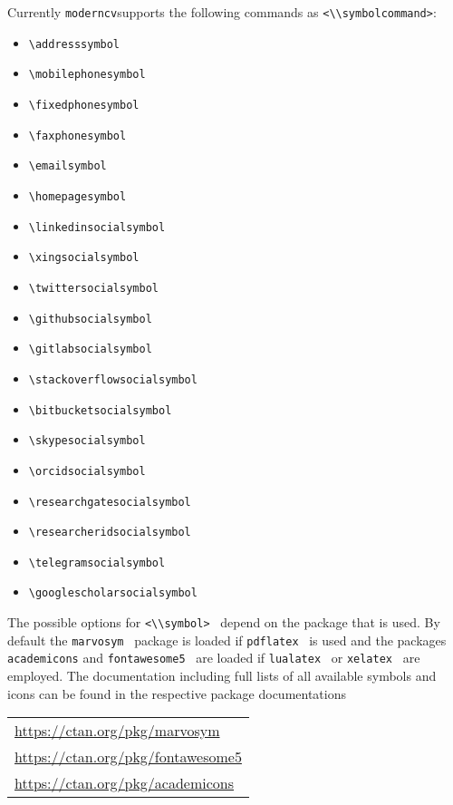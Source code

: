 \documentclass[a4paper,11pt]{article}
\newcommand{\code}[1]{\lstinline!#1!}
\newcommand{\Code}[1]{\lstinline!#1!~} %
\newcommand{\moderncv}{\code{moderncv}}
\begin{document}
Currently \moderncv supports the following commands as \code{<\\symbolcommand>}:
\begin{itemize}
  \item \lstinline!\addresssymbol!
  \item \lstinline!\mobilephonesymbol!
  \item \lstinline!\fixedphonesymbol!
  \item \lstinline!\faxphonesymbol!
  \item \lstinline!\emailsymbol!
  \item \lstinline!\homepagesymbol!
  \item \lstinline!\linkedinsocialsymbol!
  \item \lstinline!\xingsocialsymbol!
  \item \lstinline!\twittersocialsymbol!
  \item \lstinline!\githubsocialsymbol!
  \item \lstinline!\gitlabsocialsymbol!
  \item \lstinline!\stackoverflowsocialsymbol!
  \item \lstinline!\bitbucketsocialsymbol!
  \item \lstinline!\skypesocialsymbol!
  \item \lstinline!\orcidsocialsymbol!
  \item \lstinline!\researchgatesocialsymbol!
  \item \lstinline!\researcheridsocialsymbol!
  \item \lstinline!\telegramsocialsymbol!
  \item \lstinline!\googlescholarsocialsymbol!
\end{itemize}
The possible options for \Code{<\\symbol>} depend on the package that is used. 
By default the \Code{marvosym} package is loaded if \Code{pdflatex} is used and the packages 
\code{academicons} and \Code{fontawesome5} are loaded if \Code{lualatex} or \Code{xelatex} are 
employed. The documentation including full lists of all available symbols and icons can be found 
in the respective package documentations \medskip

\begin{tabular}{l}
  \url{https://ctan.org/pkg/marvosym}\\[1ex]
  \url{https://ctan.org/pkg/fontawesome5}\\[1ex]
  \url{https://ctan.org/pkg/academicons}
\end{tabular}
\end{document}
